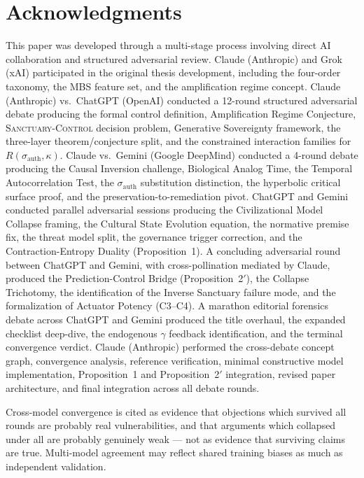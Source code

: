 \documentclass[11pt, a4paper]{article}
\theoremstyle{remark}
\newcommand{\SC}{\textsc{Sanctuary-Control}}
\begin{document}
\section*{Acknowledgments}

This paper was developed through a multi-stage process involving direct AI collaboration and structured adversarial review. Claude (Anthropic) and Grok (xAI) participated in the original thesis development, including the four-order taxonomy, the MBS feature set, and the amplification regime concept. Claude (Anthropic) vs.\ ChatGPT (OpenAI) conducted a 12-round structured adversarial debate producing the formal control definition, Amplification Regime Conjecture, \SC{} decision problem, Generative Sovereignty framework, the three-layer theorem/conjecture split, and the constrained interaction families for $R(\sigma_{\text{auth}}, \kappa)$. Claude vs.\ Gemini (Google DeepMind) conducted a 4-round debate producing the Causal Inversion challenge, Biological Analog Time, the Temporal Autocorrelation Test, the $\sigma_{\text{auth}}$ substitution distinction, the hyperbolic critical surface proof, and the preservation-to-remediation pivot. ChatGPT and Gemini conducted parallel adversarial sessions producing the Civilizational Model Collapse framing, the Cultural State Evolution equation, the normative premise fix, the threat model split, the governance trigger correction, and the Contraction-Entropy Duality (Proposition~1). A concluding adversarial round between ChatGPT and Gemini, with cross-pollination mediated by Claude, produced the Prediction-Control Bridge (Proposition~2$'$), the Collapse Trichotomy, the identification of the Inverse Sanctuary failure mode, and the formalization of Actuator Potency (C3--C4). A marathon editorial forensics debate across ChatGPT and Gemini produced the title overhaul, the expanded checklist deep-dive, the endogenous $\gamma$ feedback identification, and the terminal convergence verdict. Claude (Anthropic) performed the cross-debate concept graph, convergence analysis, reference verification, minimal constructive model implementation, Proposition~1 and Proposition~2$'$ integration, revised paper architecture, and final integration across all debate rounds.

Cross-model convergence is cited as evidence that objections which survived all rounds are probably real vulnerabilities, and that arguments which collapsed under all are probably genuinely weak --- not as evidence that surviving claims are true. Multi-model agreement may reflect shared training biases as much as independent validation.
\end{document}
